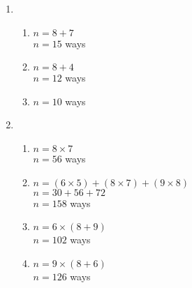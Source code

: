 {\begin{enumerate}[label = \arabic*. ]
\begin{enumerate}[label = \alph*. ]
\end{enumerate} 
\item %
\begin{enumerate}[label = \alph*. ]
\item %
$n = 8+7 $ \redcheck \\ 
$n = 15 $ ways \redcheck \\ 
\item %
$n = 8+4 $ \redcheck \\ 
$n = 12 $ ways \redcheck \\ 
\item %
$n = 10 $ ways \redcheck \\ 
\end{enumerate} 
\item %
\begin{enumerate}[label = \alph*. ]
\item %
$n = 8 \times 7 $ \redcheck \\ 
$n = 56 $ ways \redcheck \\ 
\item %
$n = (6 \times 5) + (8 \times 7) + (9 \times 8) $ \redcheck \\ 
$n = 30 + 56 + 72 $ \redcheck \\ 
$n = 158 $ ways \redcheck \\ 
\item %
$n = 6 \times (8+9)  $ \redcheck \\ 
$n = 102 $ ways \redcheck \\ 
\item %
$n = 9 \times (8+6)  $ \redcheck \\ 
$n = 126 $ ways \redcheck \\ 
\end{enumerate} 

\end{enumerate}}

